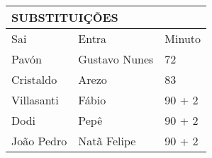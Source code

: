 \begin{table}[H]
\begin{tabular}{|lll|}
\hline
\multicolumn{3}{|l|}{\textbf{SUBSTITUIÇÕES}}                                  \\ \hline
\multicolumn{1}{|l|}{Sai}       & \multicolumn{1}{l|}{Entra}         & Minuto \\ \hline
\multicolumn{1}{|l|}{Pavón}     & \multicolumn{1}{l|}{Gustavo Nunes}    &    72    \\ \hline
\multicolumn{1}{|l|}{Cristaldo} & \multicolumn{1}{l|}{Arezo}          &    83    \\ \hline
\multicolumn{1}{|l|}{Villasanti}    & \multicolumn{1}{l|}{Fábio} &      90 + 2  \\ \hline
\multicolumn{1}{|l|}{Dodi}   & \multicolumn{1}{l|}{Pepê}    &    90 + 2    \\ \hline
\multicolumn{1}{|l|}{João Pedro} & \multicolumn{1}{l|}{Natã Felipe}     &   90 + 2     \\ \hline
\end{tabular}
\end{table}